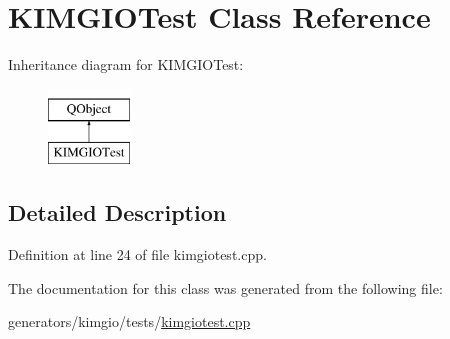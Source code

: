 \hypertarget{classKIMGIOTest}{\section{K\+I\+M\+G\+I\+O\+Test Class Reference}
\label{classKIMGIOTest}
}
Inheritance diagram for K\+I\+M\+G\+I\+O\+Test\+:\begin{figure}[H]
\begin{center}
\leavevmode
\includegraphics[height=2.000000cm]{classKIMGIOTest}
\end{center}
\end{figure}


\subsection{Detailed Description}


Definition at line 24 of file kimgiotest.\+cpp.



The documentation for this class was generated from the following file\+:\begin{DoxyCompactItemize}
\item 
generators/kimgio/tests/\hyperlink{kimgiotest_8cpp}{kimgiotest.\+cpp}\end{DoxyCompactItemize}
